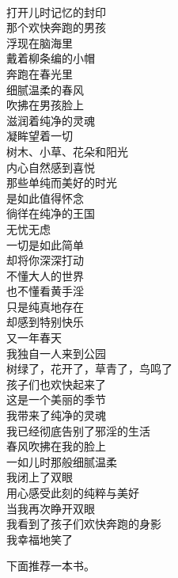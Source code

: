 \begin{poem}[春风吹醒纯净的灵魂]
    \begin{multicols}{3}
        \centering~\\
        打开儿时记忆的封印 \\ 那个欢快奔跑的男孩 \\ 浮现在脑海里 \\ 戴着柳条编的小帽 \\ 奔跑在春光里 \\ 细腻温柔的春风 \\ 吹拂在男孩脸上 \\ 滋润着纯净的灵魂 \\ 凝眸望着一切 \\ 树木、小草、花朵和阳光 \\ 内心自然感到喜悦 \\ 那些单纯而美好的时光 \\ 是如此值得怀念 \\ 徜徉在纯净的王国 \\ 无忧无虑 \\ 一切是如此简单 \\ 却将你深深打动 \\ 不懂大人的世界 \\ 也不懂看黄手淫 \\ 只是纯真地存在 \\ 却感到特别快乐 \\ 又一年春天 \\ 我独自一人来到公园 \\ 树绿了，花开了，草青了，鸟鸣了 \\ 孩子们也欢快起来了 \\ 这是一个美丽的季节 \\ 我带来了纯净的灵魂 \\ 我已经彻底告别了邪淫的生活 \\ 春风吹拂在我的脸上 \\ 一如儿时那般细腻温柔 \\ 我闭上了双眼 \\ 用心感受此刻的纯粹与美好 \\ 当我再次睁开双眼 \\ 我看到了孩子们欢快奔跑的身影 \\ 我幸福地笑了
    \end{multicols}
\end{poem}

下面推荐一本书。


